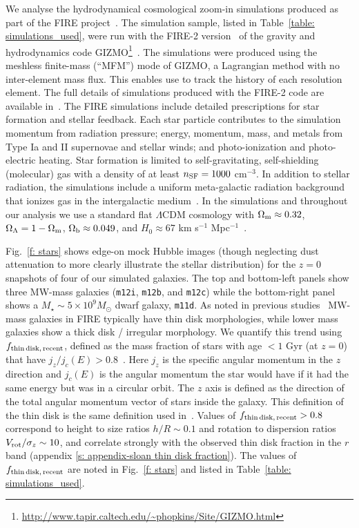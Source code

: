 \documentclass[fleqn,usenatbib]{mnras}
\newcommand{\fthin}{f_{\rm thin\,disk,\,recent}}
\begin{document}
We analyse the hydrodynamical cosmological zoom-in simulations produced as part of the FIRE project~\citep{Hopkins2014}.
The simulation sample, listed in Table~\ref{table: simulations_used}, were run with the FIRE-2 version~\citep{Hopkins2018} of the gravity and hydrodynamics code \textsc{GIZMO}\footnote{\url{http://www.tapir.caltech.edu/\~phopkins/Site/GIZMO.html}}~\citep{Hopkins2015}.
The simulations were produced using the meshless finite-mass (``MFM'') mode of \textsc{GIZMO}, a Lagrangian method with no inter-element mass flux.
This enables use to track the history of each resolution element.
The full details of simulations produced with the FIRE-2 code are available in~\cite{Hopkins2018}.
The FIRE simulations include detailed prescriptions for star formation and stellar feedback.
Each star particle contributes to the simulation momentum from radiation pressure; energy, momentum, mass, and metals from Type Ia and II supernovae and stellar winds; and photo-ionization and photo-electric heating.
Star formation is limited to self-gravitating, self-shielding (molecular) gas with a density of at least $n_{\rm SF} = 1000$ cm$^{-3}$.
In addition to stellar radiation, the simulations include a uniform meta-galactic radiation background that ionizes gas in the intergalactic medium~\citep{Faucher-Giguere2009}.
In the simulations and throughout our analysis we use a standard flat $\Lambda$CDM cosmology with $\Omega_{\rm m }\approx 0.32$, $\Omega_{\Lambda}=1-\Omega_{\rm m}$, $\Omega_{\rm b} \approx 0.049$, and $H_{0} \approx 67$ km s$^{-1}$ Mpc$^{-1}$~\citep[e.g.,][]{PlanckCollaboration2018}.

Fig.~\ref{f: stars} shows edge-on mock Hubble images (though neglecting dust attenuation to more clearly illustrate the stellar distribution) for the $z=0$ snapshots of four of our simulated galaxies.
The top and bottom-left panels show three MW-mass galaxies (\texttt{m12i}, \texttt{m12b}, and \texttt{m12c}) while the bottom-right panel shows a $M_\star \sim 5 \times 10^9 M_\odot$ dwarf galaxy, \texttt{m11d}.
As noted in previous studies~\citep{Garrison-Kimmel2018, El-Badry2018} MW-mass galaxies in FIRE typically have thin disk morphologies, while lower mass galaxies show a thick disk / irregular morphology.
We quantify this trend using $\fthin$, defined as the mass fraction of stars with age $<1$ Gyr (at $z=0$) that have $j_z/j_c(E) > 0.8$~\citep[e.g.][]{Yu2021}.
Here $j_z$ is the specific angular momentum in the $z$ direction and $j_c(E)$ is the angular momentum the star would have if it had the same energy but was in a circular orbit.
The $z$ axis is defined as the direction of the total angular momentum vector of stars inside the galaxy.
This definition of the thin disk is the same definition used in~\cite{Yu2021}.
Values of $\fthin>0.8$ correspond to height to size ratios $h/R \sim 0.1$ and rotation to dispersion ratios $V_{\rm rot}/\sigma_z \sim10$, and correlate strongly with the observed thin disk fraction in the $r$ band (appendix \ref{s: appendix-sloan thin disk fraction}).
The values of $\fthin$ are noted in Fig.~\ref{f: stars} and listed in Table~\ref{table: simulations_used}.
\end{document}
